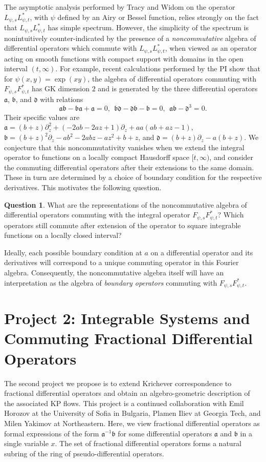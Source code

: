 \documentclass[11pt,letterpaper]{article}
\theoremstyle{definition}
\newtheorem{quest}{Question}
\newcommand{\vocab}[1]{\emph{#1}}
\begin{document}
The asymptotic analysis performed by Tracy and Widom on the operator $L_{\psi,s}L_{\psi,t}^*$, with $\psi$ defined by an Airy or Bessel function, relies strongly on the fact that $L_{\psi,s}L_{\psi,t}^*$ has simple spectrum.
However, the simplicity of the spectrum is nonintuitively counter-indicated by the presence of a \emph{noncommutative} algebra of differential operators which commute with $L_{\psi,s}L_{\psi,t}^*$, when viewed as an operator acting on smooth functions with compact support with domains in the open interval $(t,\infty)$.
For example, recent calculations performed by the PI show that for $\psi(x,y) = \exp(xy)$, the algebra of differential operators commuting with $F_{\psi,s}F_{\psi,t}^*$ has GK dimension $2$ and is generated by the three differential operators $\mathfrak a$, $\mathfrak b$, and $\mathfrak d$ with relations
$$\mathfrak a\mathfrak b-\mathfrak b\mathfrak a + \mathfrak a = 0,\ \ \mathfrak b\mathfrak d - \mathfrak d\mathfrak b - \mathfrak b = 0,\ \ \mathfrak a\mathfrak b-\mathfrak d^3 = 0.$$
Their specific values are $\mathfrak a = (b+z)\partial_z^2 + (-2ab-2az+1)\partial_z+aa(ab+az-1)$, $\mathfrak b = (b+z)^2\partial_z - ab^2 - 2abz -az^2+b+z$, and $\mathfrak d = (b+z)\partial_z - a(b+z)$.
We conjecture that this noncommutativity vanishes when we extend the integral operator to functions on a locally compact Hausdorff space $[t,\infty)$, and consider the commuting differential operators after their extensions to the same domain.
These in turn are determined by a choice of boundary condition for the respective derivatives.
This motivates the following question.
\begin{quest}
What are the representations of the noncommutative algebra of differential operators commuting with the integral operator $F_{\psi,s}F_{\psi,t}^*$?
Which operators still commute after extension of the operator to square integrable functions on a locally closed interval?
\end{quest}
Ideally, each possible boundary condition at $a$ on a differential operator and its derivatives will correspond to a unique commuting operator in this Fourier algebra.
Consequently, the noncommutative algebra itself will have an interpretation as the algebra of \vocab{boundary operators} commuting with $F_{\psi,s}F_{\psi,t}^*$.

\section{Project 2: Integrable Systems and Commuting Fractional Differential Operators}\label{sec:commuting fractional}
The second project we propose is to extend Krichever correspondence to fractional differential operators and obtain an algebro-geometric description of the associated KP flows.
This project is a continued collaboration with Emil Horozov at the University of Sofia in Bulgaria, Plamen Iliev at Georgia Tech, and Milen Yakimov at Northeastern.
Here, we view fractional differential operators as formal expressions of the form $\mathfrak a^{-1}\mathfrak b$ for some differential operators $\mathfrak a$ and $\mathfrak b$ in a single variable $x$.
The set of fractional differential operators forms a natural subring of the ring of pseudo-differential operators.
\end{document}
